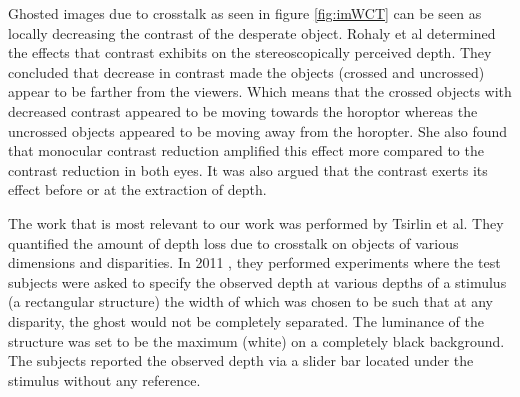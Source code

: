 Ghosted images due to crosstalk as seen in figure \ref{fig:imWCT} can be seen as locally decreasing the contrast of the desperate object. Rohaly et al \cite{rohaly1999effects} determined the effects that contrast exhibits on the stereoscopically perceived depth. They concluded that decrease in contrast made the objects (crossed and uncrossed) appear to be farther from the viewers. Which means that the crossed objects with decreased contrast appeared to be moving towards the horoptor whereas the uncrossed objects appeared to be moving away from the horopter. She also found that monocular contrast reduction amplified this effect more compared to the contrast reduction in both eyes. It was also argued that the contrast exerts its effect before or at the extraction of depth.

The work that is most relevant to our work was performed by Tsirlin et al. They quantified the amount of depth loss due to crosstalk on objects of various dimensions and disparities. In 2011 \cite{tsirlin2011effect}, they performed experiments where the test subjects were asked to specify the observed depth at various depths of a stimulus (a rectangular structure) the width of which was chosen to be such that at any disparity, the ghost would not be completely separated. The luminance of the structure was set to be the maximum (white) on a completely black background. The subjects reported the observed depth via a slider bar located under the stimulus without any reference.
